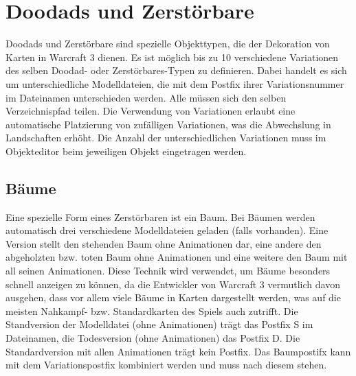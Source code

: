 \chapter{Doodads und Zerstörbare}
Doodads und Zerstörbare sind spezielle Objekttypen, die der Dekoration von Karten in Warcraft 3 dienen. Es ist möglich bis zu 10 verschiedene Variationen des selben Doodad- oder Zerstörbares-Typen zu definieren.
Dabei handelt es sich um unterschiedliche Modelldateien, die mit dem Postfix ihrer Variationsnummer im Dateinamen unterschieden werden.
Alle müssen sich den selben Verzeichnispfad teilen.
Die Verwendung von Variationen erlaubt eine automatische Platzierung von zufälligen Variationen, was die Abwechslung in Landschaften erhöht.
Die Anzahl der unterschiedlichen Variationen muss im Objekteditor beim jeweiligen Objekt eingetragen werden.
\section{Bäume}
Eine spezielle Form eines Zerstörbaren ist ein Baum. Bei Bäumen werden automatisch drei verschiedene Modelldateien geladen (falls vorhanden).
Eine Version stellt den stehenden Baum ohne Animationen dar, eine andere den abgeholzten bzw. toten Baum ohne Animationen und eine weitere den Baum mit all seinen Animationen.
Diese Technik wird verwendet, um Bäume besonders schnell anzeigen zu können, da die Entwickler von Warcraft 3 vermutlich davon ausgehen, dass vor allem viele Bäume in Karten dargestellt werden, was auf die meisten Nahkampf- bzw. Standardkarten des Spiels auch zutrifft.
Die Standversion der Modelldatei (ohne Animationen) trägt das Postfix S im Dateinamen, die Todesversion (ohne Animationen) das Postfix D. Die Standardversion mit allen Animationen trägt kein Postfix.
Das Baumpostifx kann mit dem Variationspostfix kombiniert werden und muss nach diesem stehen.